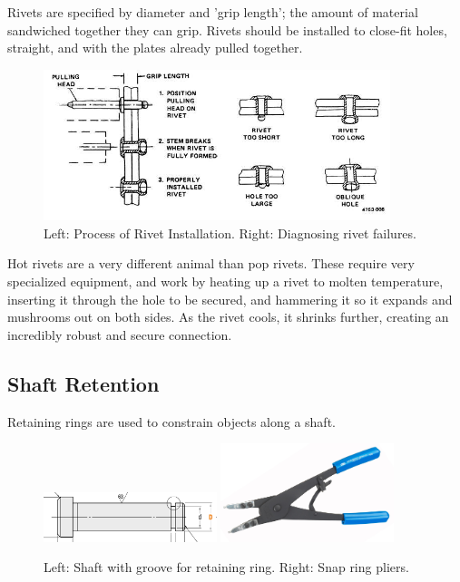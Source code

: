 \documentclass[10pt,letterpaper]{book}
\begin{document}
	Rivets are specified by diameter and 'grip length'; the amount of material sandwiched together they can grip. Rivets should be installed to close-fit holes, straight, and with the plates already pulled together.
	
	\begin{figure}[H] \centering
		\includegraphics[width=0.9\textwidth]{imgs/rivet_install.jpeg}
		\caption{Left: Process of Rivet Installation. Right: Diagnosing rivet failures.}
	\end{figure}
	
	Hot rivets are a very different animal than pop rivets. These require very specialized equipment, and work by heating up a rivet to molten temperature, inserting it through the hole to be secured, and hammering it so it expands and mushrooms out on both sides. As the rivet cools, it shrinks further, creating an incredibly robust and secure connection.	
	
	\subsection{Shaft Retention}
	
	Retaining rings are used to constrain objects along a shaft.
	
	\begin{figure}[H]
		\centering
		\includegraphics[width=0.45\textwidth]{imgs/shaft_snapringgroove.png}
		\includegraphics[width=0.45\textwidth]{imgs/snapringtool.jpeg}
		\caption{Left: Shaft with groove for retaining ring. Right: Snap ring pliers.}
	\end{figure}
	
\end{document}
